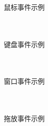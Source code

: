 \documentclass[UTF8,aspectratio=169]{beamer}
\begin{document}
\begin{frame}[fragile]{鼠标事件示例}
    \begin{columns}
        \begin{column}{0.48\textwidth}
            \inputminted[firstline=1,lastline=19]{cpp}{code/qt_mouse_event_example.cpp}
        \end{column}
        \begin{column}{0.48\textwidth}
            \inputminted[firstline=21,lastline=41]{cpp}{code/qt_mouse_event_example.cpp}
        \end{column}
    \end{columns}
\end{frame}

\begin{frame}[fragile]{键盘事件示例}
    \begin{columns}
        \begin{column}{0.48\textwidth}
            \inputminted[firstline=1,lastline=21]{cpp}{code/qt_keyboard_event_example.cpp}
        \end{column}
        \begin{column}{0.48\textwidth}
            \inputminted[firstline=22,lastline=38]{cpp}{code/qt_keyboard_event_example.cpp}
        \end{column}
    \end{columns}
\end{frame}

\begin{frame}[fragile]{窗口事件示例}
    \begin{columns}
        \begin{column}{0.48\textwidth}
            \inputminted[firstline=1,lastline=20]{cpp}{code/qt_window_event_example.cpp}
        \end{column}
        \begin{column}{0.48\textwidth}
            \inputminted[firstline=22,lastline=39]{cpp}{code/qt_window_event_example.cpp}
        \end{column}
    \end{columns}
\end{frame}

\begin{frame}[fragile]{拖放事件示例}
    \begin{columns}
        \begin{column}{0.48\textwidth}
            \inputminted[firstline=1,lastline=22]{cpp}{code/qt_drag_drop_event_example.cpp}
        \end{column}
        \begin{column}{0.48\textwidth}
            \inputminted[firstline=23,lastline=44]{cpp}{code/qt_drag_drop_event_example.cpp}
        \end{column}
    \end{columns}
\end{frame}
\end{document}
